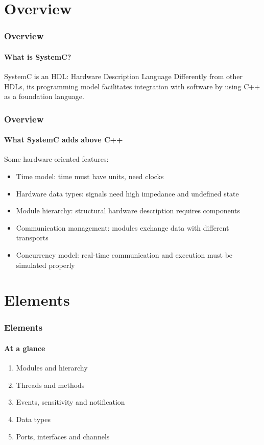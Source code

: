 \section{Overview}

\begin{frame}
\frametitle{Overview}
\framesubtitle{What is SystemC?}

\begin{block}{SystemC is an HDL: Hardware Description Language}
Differently from other HDLs, its programming model facilitates integration with software by using C++ as a foundation language.
\end{block}

\end{frame}

\begin{frame}
\frametitle{Overview}
\framesubtitle{What SystemC adds above C++}

\begin{block}{Some hardware-oriented features:}
\begin{itemize}
\item Time model: time must have units, need clocks
\pause
\item Hardware data types: signals need high impedance and undefined state
\pause
\item Module hierarchy: structural hardware description requires components
\pause
\item Communication management: modules exchange data with different transports
\pause
\item Concurrency model: real-time communication and execution must be simulated properly
\end{itemize}
\end{block}

\end{frame}

\section{Elements}

\begin{frame}
\frametitle{Elements}
\framesubtitle{At a glance}

\begin{enumerate}
\item Modules and hierarchy
\item Threads and methods
\item Events, sensitivity and notification
\item Data types
\item Ports, interfaces and channels
\end{enumerate}

\end{frame}

